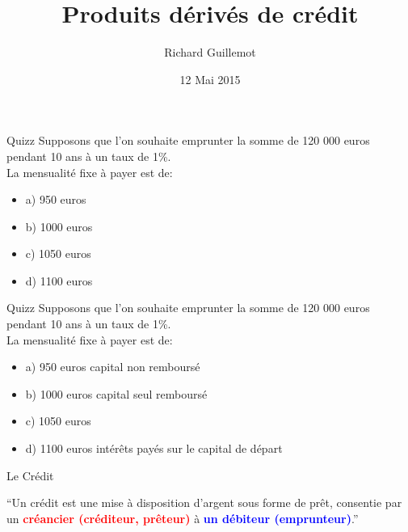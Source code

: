 \documentclass{beamer}
\title[Produits dérivés actions,change et credit]{Produits dérivés de crédit}
\author{Richard Guillemot}
\institute{DIFIQ}
\date{12 Mai 2015}
\begin{document}
\begin{frame}
\titlepage
\end{frame}

\begin{frame}{Quizz}
Supposons que l'on souhaite emprunter la somme de 120 000 euros pendant 10 ans à un taux de 1\%.\\

\vspace{0.5cm}
La mensualité fixe à payer est de:
\begin{itemize}
\item a) 950 euros
\item b) 1000 euros
\item c) 1050 euros
\item d) 1100 euros
\end{itemize}

\end{frame}

\begin{frame}{Quizz}
Supposons que l'on souhaite emprunter la somme de 120 000 euros pendant 10 ans à un taux de 1\%.\\

\vspace{0.5cm}
La mensualité fixe à payer est de:
\begin{itemize}
\item a) 950 euros \textbf{\color{red}{FAUX}} capital non remboursé
\item b) 1000 euros \textbf{\color{red}{FAUX}} capital seul remboursé
\item c) 1050 euros \textbf{\color{green}{VRAI}}
\item d) 1100 euros \textbf{\color{red}{VRAI}} intérêts payés sur le capital de départ
\end{itemize}

\end{frame}



\begin{frame}{Le Crédit}

\begin{exampleblock}{}
  {\large ``Un crédit est une mise à disposition d'argent sous forme de prêt, consentie par un \textcolor{red}{\textbf{créancier (créditeur, prêteur)}} à \textcolor{blue}{\textbf{un débiteur (emprunteur)}}.''}
\end{exampleblock}
\vspace{0.5cm}
\end{frame}
\end{document}
